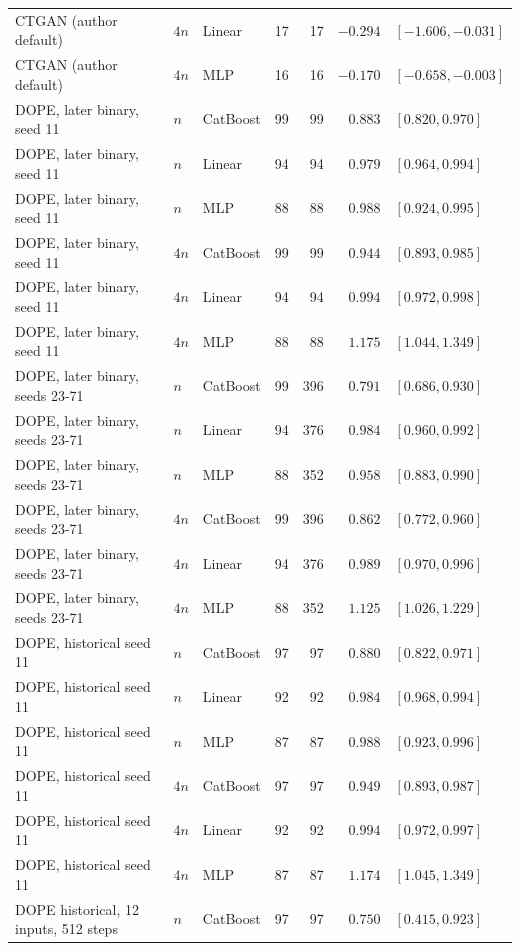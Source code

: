 \begin{longtable}{@{}p{1.6in}llrrrl@{}}
CTGAN (author default) & $4n$ & Linear & 17 & 17 & $-0.294$ & $[-1.606, -0.031]$ \\
CTGAN (author default) & $4n$ & MLP & 16 & 16 & $-0.170$ & $[-0.658, -0.003]$ \\
DOPE, later binary, seed 11 & $n$ & CatBoost & 99 & 99 & $0.883$ & $[0.820, 0.970]$ \\
DOPE, later binary, seed 11 & $n$ & Linear & 94 & 94 & $0.979$ & $[0.964, 0.994]$ \\
DOPE, later binary, seed 11 & $n$ & MLP & 88 & 88 & $0.988$ & $[0.924, 0.995]$ \\
DOPE, later binary, seed 11 & $4n$ & CatBoost & 99 & 99 & $0.944$ & $[0.893, 0.985]$ \\
DOPE, later binary, seed 11 & $4n$ & Linear & 94 & 94 & $0.994$ & $[0.972, 0.998]$ \\
DOPE, later binary, seed 11 & $4n$ & MLP & 88 & 88 & $1.175$ & $[1.044, 1.349]$ \\
DOPE, later binary, seeds 23-71 & $n$ & CatBoost & 99 & 396 & $0.791$ & $[0.686, 0.930]$ \\
DOPE, later binary, seeds 23-71 & $n$ & Linear & 94 & 376 & $0.984$ & $[0.960, 0.992]$ \\
DOPE, later binary, seeds 23-71 & $n$ & MLP & 88 & 352 & $0.958$ & $[0.883, 0.990]$ \\
DOPE, later binary, seeds 23-71 & $4n$ & CatBoost & 99 & 396 & $0.862$ & $[0.772, 0.960]$ \\
DOPE, later binary, seeds 23-71 & $4n$ & Linear & 94 & 376 & $0.989$ & $[0.970, 0.996]$ \\
DOPE, later binary, seeds 23-71 & $4n$ & MLP & 88 & 352 & $1.125$ & $[1.026, 1.229]$ \\
DOPE, historical seed 11 & $n$ & CatBoost & 97 & 97 & $0.880$ & $[0.822, 0.971]$ \\
DOPE, historical seed 11 & $n$ & Linear & 92 & 92 & $0.984$ & $[0.968, 0.994]$ \\
DOPE, historical seed 11 & $n$ & MLP & 87 & 87 & $0.988$ & $[0.923, 0.996]$ \\
DOPE, historical seed 11 & $4n$ & CatBoost & 97 & 97 & $0.949$ & $[0.893, 0.987]$ \\
DOPE, historical seed 11 & $4n$ & Linear & 92 & 92 & $0.994$ & $[0.972, 0.997]$ \\
DOPE, historical seed 11 & $4n$ & MLP & 87 & 87 & $1.174$ & $[1.045, 1.349]$ \\
DOPE historical, 12 inputs, 512 steps & $n$ & CatBoost & 97 & 97 & $0.750$ & $[0.415, 0.923]$ \\

\end{longtable}
